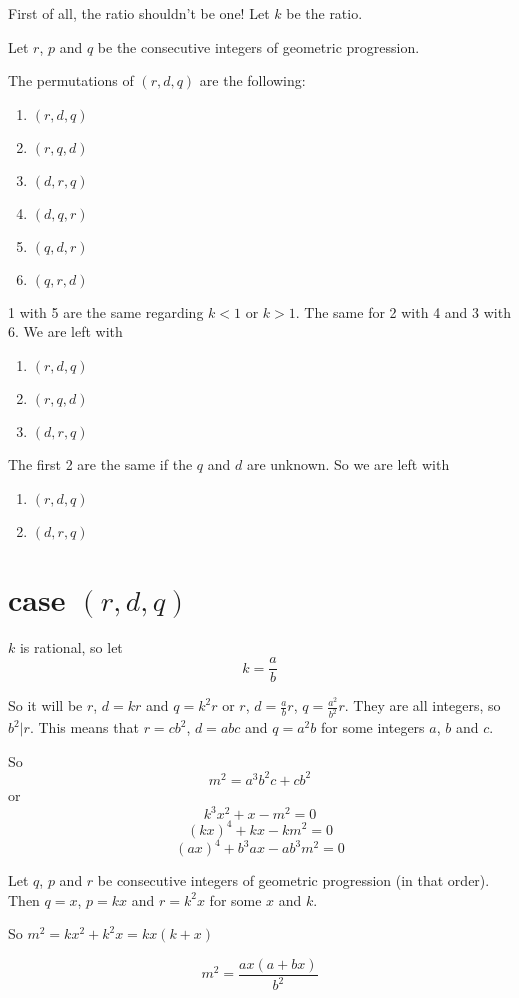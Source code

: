 \documentclass[12pt]{scrartcl}
\begin{document}
First of all, the ratio shouldn't be one! Let $k$ be the ratio.

Let $r$, $p$ and $q$ be the consecutive integers of geometric progression.

The permutations of $(r,d,q)$ are the following:
\begin{enumerate}
    \item $(r,d,q)$
    \item $(r,q,d)$
    \item $(d,r,q)$
    \item $(d,q,r)$
    \item $(q,d,r)$
    \item $(q,r,d)$
\end{enumerate}

1 with 5 are the same regarding $k<1$ or $k>1$. The same for 2 with 4 and 3 with 6. We are left with
\begin{enumerate}
    \item $(r,d,q)$
    \item $(r,q,d)$
    \item $(d,r,q)$
\end{enumerate}

The first 2 are the same if the $q$ and $d$ are unknown. So we are left with
\begin{enumerate}
    \item $(r,d,q)$
    \item $(d,r,q)$
\end{enumerate}

\part*{case $(r,d,q)$}

$k$ is rational, so let $$k=\frac{a}{b}$$

So it will be $r$, $d=kr$ and $q=k^2r$ or $r$, $d=\frac{a}{b}r$, $q=\frac{a^2}{b^2}r$. They are all integers, so $b^2|r$. This means that $r=cb^2$, $d=abc$ and $q=a^2b$ for some integers $a$, $b$ and $c$.

So $$m^2=a^3b^2c+cb^2$$ or
$$k^3x^2+x-m^2=0$$
$$(kx)^4+kx-km^2=0$$
$$(ax)^4+b^3ax-ab^3m^2=0$$

Let $q$, $p$ and $r$ be consecutive integers of geometric progression (in that order). Then $q=x$, $p=kx$ and $r=k^2x$ for some $x$ and $k$.

So $m^2=kx^2+k^2x=kx(k+x)$

$$m^2=\frac{ax(a+bx)}{b^2}$$
\end{document}
